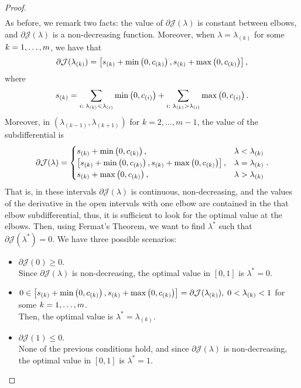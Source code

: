 \begin{proof}
\begin{equation}
\begin{aligned}
        \end{aligned}        
    \end{equation}
    As before, we remark two facts: the value of $\partial \mathcal{J}(\lambda)$ is constant between elbows, and $\partial \mathcal{J}(\lambda)$ is a non-decreasing function.
    Moreover, when $\lambda = \lambda_{(k)}$ for some $k=1, \ldots, m$, we have that
    \begin{equation}
        \nonumber
        \partial \mathcal{J}(\lambda_{(k)}) = \left[ s_{(k)} + \min\left(0, c_{(k)}\right), s_{(k)} + \max\left(0, c_{(k)}\right)  \right] ,
    \end{equation}
    where $$s_{(k)} = \sum_{i: \; \lambda_{(k)} < \lambda_{(i)}} \min\left(0, c_{(i)}\right) + \sum_{i: \; \lambda_{(k)} > \lambda_{(i)}} \max\left(0, c_{(i)}\right).$$
    Moreover, in $(\lambda_{(k-1)}, \lambda_{(k+1)})$ for $k=2, \ldots, m-1$, the value of the subdifferential is
    \begin{equation}
        \nonumber
        \partial \mathcal{J}(\lambda) = \begin{cases}
            s_{(k)} + \min\left(0, c_{(k)}\right),& \lambda < \lambda_{(k)}\\
            \left[ s_{(k)} + \min\left(0, c_{(k)}\right), s_{(k)} + \max\left(0, c_{(k)}\right)   \right],& \lambda = \lambda_{(k)} \\
            s_{(k)} + \max\left(0, c_{(k)}\right),& \lambda > \lambda_{(k)}
        \end{cases} .
    \end{equation}
    That is, in these intervals $\partial \mathcal{J}(\lambda)$ is continuous, non-decreasing, and the values of the derivative in the open intervals with one elbow are contained in the that elbow subdifferential, thus, it is sufficient to look for the optimal value at the elbows.
    Then, using Fermat's Theorem, we want to find $\lambda^*$ such that $\partial \mathcal{J}(\lambda^*) = 0$. We have three possible scenarios:
    \begin{itemize}
        \item $\partial \mathcal{J}(0) \geq 0.$ 
        \\Since $\partial \mathcal{J}(\lambda)$ is non-decreasing, the optimal value in $[0, 1]$ is $\lambda^* = 0$.
        \item $0 \in \left[ s_{(k)} + \min\left(0, c_{(k)}\right), s_{(k)} + \max\left(0, c_{(k)}\right)   \right] = \partial \mathcal{J}(\lambda_{(k)}), \; 0 < \lambda_{(k)} < 1$ for some $k=1, \ldots, m$. 
        \\Then, the optimal value is $\lambda^*=\lambda_{(k)}$.
        \item $\partial \mathcal{J}(1) \leq 0$. 
        \\None of the previous conditions hold, and since $\partial \mathcal{J}(\lambda)$ is non-decreasing, the optimal value in $[0, 1]$ is $\lambda^* = 1$.
    \end{itemize}
\end{proof}

